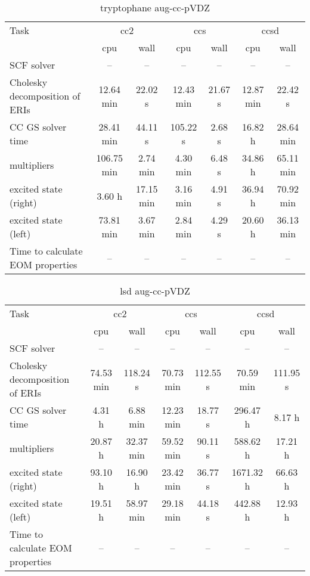 \documentclass{article}
\begin{document}
\begin{table}
\caption{tryptophane aug-cc-pVDZ}
\begin{tabular}{lcccccc}
\toprule
Task & \multicolumn{2}{c}{cc2} & \multicolumn{2}{c}{ccs} & \multicolumn{2}{c}{ccsd}\\
\cmidrule(lr){2-3}\cmidrule(lr){4-5}\cmidrule(lr){6-7}
 & cpu & wall & cpu & wall & cpu & wall\\
\midrule
SCF solver & -- & -- & -- & -- & -- & --\\
Cholesky decomposition of ERIs & 12.64 min & 22.02 s & 12.43 min & 21.67 s & 12.87 min & 22.42 s\\
CC GS solver time & 28.41 min & 44.11 s & 105.22 s & 2.68 s & 16.82 h & 28.64 min\\
multipliers & 106.75 min & 2.74 min & 4.30 min & 6.48 s & 34.86 h & 65.11 min\\
excited state (right) & 3.60 h & 17.15 min & 3.16 min & 4.91 s & 36.94 h & 70.92 min\\
excited state (left) & 73.81 min & 3.67 min & 2.84 min & 4.29 s & 20.60 h & 36.13 min\\
Time to calculate EOM properties & -- & -- & -- & -- & -- & --\\
\bottomrule
\end{tabular}
\end{table}
\begin{table}
\caption{lsd aug-cc-pVDZ}
\begin{tabular}{lcccccc}
\toprule
Task & \multicolumn{2}{c}{cc2} & \multicolumn{2}{c}{ccs} & \multicolumn{2}{c}{ccsd}\\
\cmidrule(lr){2-3}\cmidrule(lr){4-5}\cmidrule(lr){6-7}
 & cpu & wall & cpu & wall & cpu & wall\\
\midrule
SCF solver & -- & -- & -- & -- & -- & --\\
Cholesky decomposition of ERIs & 74.53 min & 118.24 s & 70.73 min & 112.55 s & 70.59 min & 111.95 s\\
CC GS solver time & 4.31 h & 6.88 min & 12.23 min & 18.77 s & 296.47 h & 8.17 h\\
multipliers & 20.87 h & 32.37 min & 59.52 min & 90.11 s & 588.62 h & 17.21 h\\
excited state (right) & 93.10 h & 16.90 h & 23.42 min & 36.77 s & 1671.32 h & 66.63 h\\
excited state (left) & 19.51 h & 58.97 min & 29.18 min & 44.18 s & 442.88 h & 12.93 h\\
Time to calculate EOM properties & -- & -- & -- & -- & -- & --\\
\bottomrule
\end{tabular}
\end{table}
\end{document}

